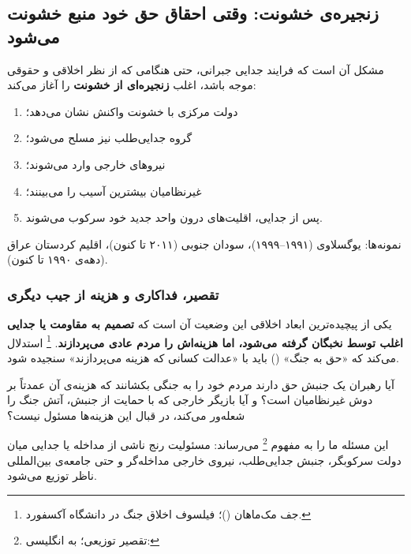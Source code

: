 \subsection{زنجیره‌ی خشونت: وقتی احقاق حق خود منبع خشونت می‌شود}
\label{subsec:ch02-t4-violence}

\begin{tcolorbox}[enemybox,
	title={معضل زنجیره‌ی خشونت}]
	مشکل آن است که فرایند جدایی جبرانی، حتی هنگامی که از نظر
	اخلاقی و حقوقی موجه باشد، اغلب \textbf{زنجیره‌ای از خشونت}
	را آغاز می‌کند:
	\begin{enumerate}[label=\textbf{\alph*.}, nosep, rightmargin=1em]
		\item دولت مرکزی با خشونت واکنش نشان می‌دهد؛
		\item گروه جدایی‌طلب نیز مسلح می‌شود؛
		\item نیروهای خارجی وارد می‌شوند؛
		\item غیرنظامیان بیشترین آسیب را می‌بینند؛
		\item پس از جدایی، اقلیت‌های درون واحد جدید خود سرکوب می‌شوند.
	\end{enumerate}
	
	نمونه‌ها: یوگسلاوی (۱۹۹۱--۱۹۹۹)، سودان جنوبی (۲۰۱۱ تا کنون)،
	اقلیم کردستان عراق (دهه‌ی ۱۹۹۰ تا کنون).
\end{tcolorbox}

\subsubsection{تقصیر، فداکاری و هزینه از جیب دیگری}
\label{subsubsec:ch02-t4-blame}

یکی از پیچیده‌ترین ابعاد اخلاقی این وضعیت آن است که \textbf{تصمیم
	به مقاومت یا جدایی اغلب توسط نخبگان گرفته می‌شود، اما هزینه‌اش
	را مردم عادی می‌پردازند}.
%
\footnote{%
	جف مک‌ماهان ()؛%
	فیلسوف اخلاق جنگ در دانشگاه آکسفورد.%
}%
استدلال می‌کند که «حق به جنگ» () باید
با «عدالت کسانی که هزینه می‌پردازند» سنجیده
شود.

\begin{tcolorbox}[wavebox, title={پرسش اخلاقی بنیادین}]
	آیا رهبران یک جنبش حق دارند مردم خود را به جنگی بکشانند
	که هزینه‌ی آن عمدتاً بر دوش غیرنظامیان است؟ و آیا بازیگر
	خارجی که با حمایت از جنبش، آتش جنگ را شعله‌ور می‌کند، در
	قبال این هزینه‌ها مسئول نیست؟
	
	این مسئله ما را به مفهوم %
	\footnote{تقصیر توزیعی؛ به انگلیسی: }%
	می‌رساند: مسئولیت رنج ناشی از مداخله یا جدایی میان دولت
	سرکوبگر، جنبش جدایی‌طلب، نیروی خارجی مداخله‌گر و حتی جامعه‌ی
	بین‌المللی ناظر توزیع
	می‌شود.
\end{tcolorbox}


